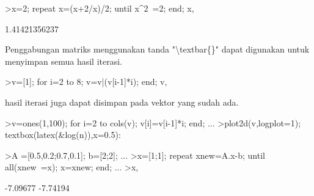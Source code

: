 \documentclass{article}
\begin{document}
\begin{eulernotebook}
\begin{eulercomment}
\begin{eulercomment}
\begin{eulercomment}
\begin{eulercomment}
\begin{eulercomment}
\begin{eulercomment}
\begin{eulercomment}
\begin{eulercomment}
\begin{eulercomment}
\begin{eulercomment}
\begin{eulercomment}
\begin{eulercomment}
\begin{eulercomment}
\begin{eulercomment}
\begin{eulercomment}
\begin{eulercomment}
\begin{eulercomment}
\begin{eulercomment}
\begin{eulercomment}
\begin{eulercomment}
\begin{eulercomment}
\begin{eulercomment}
\begin{eulercomment}
\begin{eulercomment}
\begin{eulercomment}
\begin{eulercomment}
\begin{eulercomment}
\begin{eulercomment}
\begin{eulercomment}
\begin{eulercomment}
\begin{eulercomment}
\begin{eulercomment}
\begin{eulercomment}
\begin{eulercomment}
\begin{eulerprompt}
>x=2; repeat x=(x+2/x)/2; until x^2~=2; end; x,
\end{eulerprompt}
\begin{euleroutput}
  1.41421356237
\end{euleroutput}
\begin{eulercomment}
Penggabungan matriks menggunakan tanda "\textbackslash{}textbar\{\}" dapat digunakan
untuk menyimpan semua hasil iterasi.
\end{eulercomment}
\begin{eulerprompt}
>v=[1]; for i=2 to 8; v=v|(v[i-1]*i); end; v,
\end{eulerprompt}
\begin{euleroutput}
  [1,  2,  6,  24,  120,  720,  5040,  40320]
\end{euleroutput}
\begin{eulercomment}
hasil iterasi juga dapat disimpan pada vektor yang sudah ada.
\end{eulercomment}
\begin{eulerprompt}
>v=ones(1,100); for i=2 to cols(v); v[i]=v[i-1]*i; end; ...
>plot2d(v,logplot=1); textbox(latex(&log(n)),x=0.5):
\end{eulerprompt}
\begin{eulerprompt}
>A =[0.5,0.2;0.7,0.1]; b=[2;2]; ...
>x=[1;1]; repeat xnew=A.x-b; until all(xnew~=x); x=xnew; end; ...
>x,
\end{eulerprompt}
\begin{euleroutput}
       -7.09677 
       -7.74194 
\end{euleroutput}
\begin{eulercomment}
\begin{eulercomment}

\end{eulercomment}
\end{eulercomment}
\end{eulercomment}
\end{eulercomment}
\end{eulercomment}
\end{eulercomment}
\end{eulercomment}
\end{eulercomment}
\end{eulercomment}
\end{eulercomment}
\end{eulercomment}
\end{eulercomment}
\end{eulercomment}
\end{eulercomment}
\end{eulercomment}
\end{eulercomment}
\end{eulercomment}
\end{eulercomment}
\end{eulercomment}
\end{eulercomment}
\end{eulercomment}
\end{eulercomment}
\end{eulercomment}
\end{eulercomment}
\end{eulercomment}
\end{eulercomment}
\end{eulercomment}
\end{eulercomment}
\end{eulercomment}
\end{eulercomment}
\end{eulercomment}
\end{eulercomment}
\end{eulercomment}
\end{eulercomment}
\end{eulercomment}
\end{eulercomment}
\end{eulernotebook}
\end{document}
